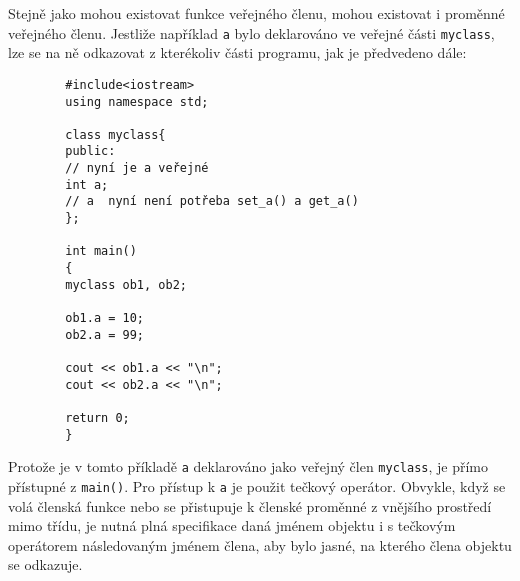     \begin{example}
      Stejně jako mohou existovat funkce veřejného členu, mohou existovat i proměnné veřejného členu. Jestliže například
      \lstinline[basicstyle=\ttfamily]!a! bylo deklarováno ve veřejné části \lstinline[basicstyle=\ttfamily]!myclass!, lze se na
      ně odkazovat z kterékoliv části programu, jak je předvedeno dále:
        \begin{lstlisting}
        #include<iostream>
        using namespace std;

        class myclass{
        public:
        // nyní je a veřejné
        int a;
        // a  nyní není potřeba set_a() a get_a()
        };

        int main()
        {
        myclass ob1, ob2;

        ob1.a = 10;
        ob2.a = 99;

        cout << ob1.a << "\n";
        cout << ob2.a << "\n";

        return 0;
        }
        \end{lstlisting}
      Protože je v tomto příkladě \lstinline[basicstyle=\ttfamily]!a! deklarováno jako veřejný člen
      \lstinline[basicstyle=\ttfamily]!myclass!, je přímo přístupné z \lstinline[basicstyle=\ttfamily]!main()!. Pro přístup k
      \lstinline[basicstyle=\ttfamily]!a! je použit tečkový operátor. Obvykle, když se volá členská funkce nebo se přistupuje k
      členské proměnné z vnějšího prostředí mimo třídu, je nutná plná specifikace daná jménem objektu i s tečkovým operátorem
      následovaným jménem člena, aby bylo jasné, na kterého člena objektu se odkazuje.
    \end{example}

